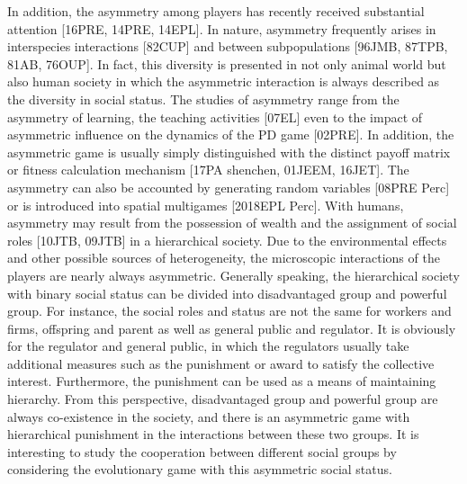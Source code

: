 \documentclass[%
 aip,
 amsmath,amssymb,
 reprint,%
]{revtex4-1}
\begin{document}
In addition, the asymmetry among players has recently received substantial attention [16PRE, 14PRE, 14EPL]. In nature, asymmetry frequently arises in interspecies interactions [82CUP] and between subpopulations [96JMB, 87TPB, 81AB, 76OUP]. In fact, this diversity is presented in not only animal world but also human society in which the asymmetric interaction is always described as the diversity in social status. The studies of asymmetry range from the asymmetry of learning, the teaching activities [07EL] even to the impact of asymmetric influence on the dynamics of the PD game [02PRE]. In addition, the asymmetric game is usually simply distinguished with the distinct payoff matrix or fitness calculation mechanism [17PA shenchen, 01JEEM, 16JET]. The asymmetry can also be accounted by generating random variables [08PRE Perc] or is introduced into spatial multigames [2018EPL Perc]. With humans, asymmetry may result from the possession of wealth and the assignment of social roles [10JTB, 09JTB] in a hierarchical society. Due to the environmental effects and other possible sources of heterogeneity, the microscopic interactions of the players are nearly always asymmetric. Generally speaking, the hierarchical society with binary social status can be divided into disadvantaged group and powerful group. For instance, the social roles and status are not the same for workers and firms, offspring and parent as well as general public and regulator. It is obviously for the regulator and general public, in which the regulators usually take additional measures such as the punishment or award to satisfy the collective interest. Furthermore, the punishment can be used as a means of maintaining hierarchy. From this perspective, disadvantaged group and powerful group are always co-existence in the society, and there is an asymmetric game with hierarchical punishment in the interactions between these two groups. It is interesting to study the cooperation between different social groups by considering the evolutionary game with this asymmetric social status.
\end{document}
